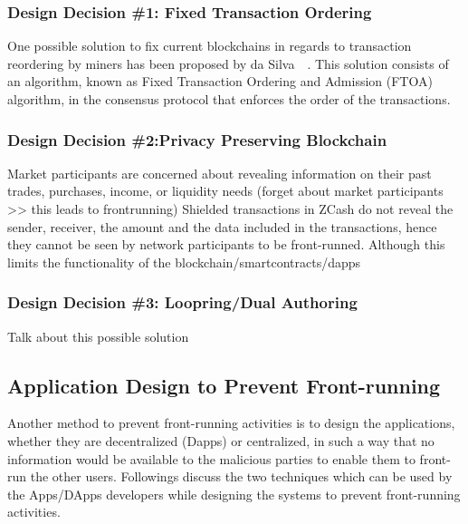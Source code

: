 \subsubsection{Design Decision \#1: Fixed Transaction Ordering\newline}

One possible solution to fix current blockchains in regards to transaction reordering by miners has been proposed by da Silva~\etal~\cite{fixedordering2018silva}. This solution consists of an algorithm, known as Fixed Transaction Ordering and Admission (FTOA) algorithm, in the consensus protocol that enforces the order of the transactions. 

\subsubsection{Design Decision \#2:Privacy Preserving Blockchain\newline}

Market participants are concerned about revealing information on their past trades, purchases, income, or liquidity needs (forget about market participants >> this leads to frontrunning)
Shielded transactions in ZCash do not reveal the sender, receiver, the amount and the data included in the transactions, hence they cannot be seen by network participants to be front-runned. Although this limits the functionality of the blockchain/smartcontracts/dapps 

\subsubsection{Design Decision \#3: Loopring/Dual Authoring\newline}
Talk about this possible solution



\subsection{Application Design to Prevent Front-running}

Another method to prevent front-running activities is to design the applications, whether they are decentralized (Dapps) or centralized, in such a way that no information would be available to the malicious parties to enable them to front-run the other users.
Followings discuss the two techniques which can be used by the Apps/DApps developers while designing the systems to prevent front-running activities.

